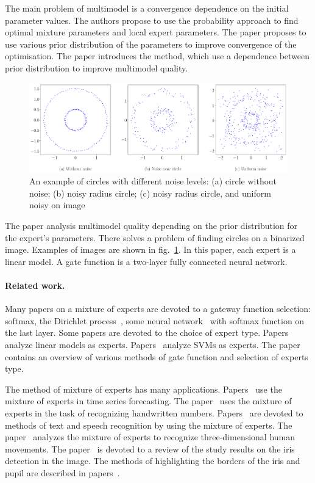 \documentclass[12pt, twoside]{article}
\numberwithin{equation}{section}
\begin{document}
The main problem of multimodel is a convergence dependence on the initial parameter values.
The authors propose to use the probability approach to find optimal mixture parameters and local expert parameters.
The paper proposes to use various prior distribution of the parameters to improve convergence of the optimisation.
The paper introduces the method, which use a dependence between prior distribution to improve multimodel quality.

\begin{figure}[h!t]\center
\includegraphics[width=1\textwidth]{result_eng/statment}
\caption{An example of circles with different noise levels: (a) circle without noise; (b) noisy radius circle; (c) noisy radius circle, and uniform noisy on image}
\label{example:1}
\end{figure}

The paper analysis multimodel quality depending on the prior distribution for the expert's parameters.
There solves a problem of finding circles on a binarized image.
Examples of images are shown in fig.~\ref{example:1}.
In this paper, each expert is a linear model.
A gate function is a two-layer fully connected neural network.

\paragraph{Related work.}
Many papers on a mixture of experts are devoted to a gateway function selection: softmax, the Dirichlet process~\cite{Edward2002}, some neural network~\cite{Shazeer2017} with softmax function on the last layer.
Some papers are devoted to the choice of expert type. 
Papers~\cite{Jordan1994, Jordan1991} analyze linear models as experts.
Papers~\cite{Lima2007, Cao2003} analyze SVMs as experts.
The paper~\cite{Yuksel2012} contains an overview of various methods of gate function and selection of experts type.

The method of mixture of experts has many applications.
Papers~\cite{Yumlu2003, Cheung1995, Weigend2000} use the mixture of experts in time series forecasting.
The paper~\cite{Ebrahimpour2009} uses the mixture of experts in the task of recognizing handwritten numbers.
Papers~\cite{Estabrooks2001, Mossavat2010, Peng1996, Tuerk2001}  are devoted to methods of text and speech recognition by using the mixture of experts.
The paper~\cite{Sminchisescu2007} analyzes the mixture of experts to recognize three-dimensional human movements.
The paper~\cite{Bowyer2010} is devoted to a review of the study results on the iris detection in the image.
The methods of highlighting the borders of the iris and pupil are described in papers~\cite{Matveev2010, Matveev2014}.
\end{document}
